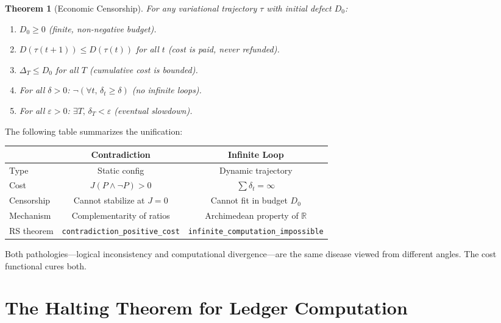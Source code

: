 \documentclass[11pt,a4paper]{article}
\theoremstyle{plain}
\newtheorem{theorem}{Theorem}[section]
\theoremstyle{definition}
\theoremstyle{remark}
\newcommand{\R}{\mathbb{R}}
\newcommand{\Jcost}{J}
\begin{document}
\begin{theorem}[Economic Censorship]\label{thm:censorship}
For any variational trajectory $\tau$ with initial defect $D_0$:
\begin{enumerate}[nosep,label=(\roman*)]
\item $D_0 \ge 0$ \quad (finite, non-negative budget).
\item $D(\tau(t{+}1)) \le D(\tau(t))$ for all $t$ \quad (cost is paid, never refunded).
\item $\Delta_T \le D_0$ for all $T$ \quad (cumulative cost is bounded).
\item For all $\delta > 0$: $\neg(\forall t,\, \delta_t \ge \delta)$ \quad (no infinite loops).
\item For all $\varepsilon > 0$: $\exists T,\, \delta_T < \varepsilon$ \quad (eventual slowdown).
\end{enumerate}
\end{theorem}

The following table summarizes the unification:

\begin{center}
\begin{tabular}{@{}lcc@{}}
\toprule
& \textbf{Contradiction} & \textbf{Infinite Loop} \\
\midrule
Type & Static config & Dynamic trajectory \\
Cost & $\Jcost(P \wedge \neg P) > 0$ & $\sum \delta_t = \infty$ \\
Censorship & Cannot stabilize at $\Jcost = 0$ & Cannot fit in budget $D_0$ \\
Mechanism & Complementarity of ratios & Archimedean property of $\R$ \\
RS theorem & \texttt{contradiction\_positive\_cost} & \texttt{infinite\_computation\_impossible} \\
\bottomrule
\end{tabular}
\end{center}

Both pathologies---logical inconsistency and computational divergence---are the same disease viewed from different angles.
The cost functional cures both.

\section{The Halting Theorem for Ledger Computation}\label{sec:halting}
\end{document}
